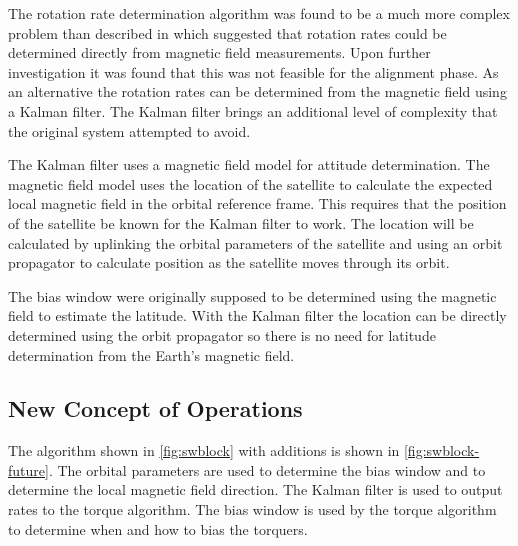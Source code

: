 The rotation rate determination algorithm was found to be a much more complex problem than described in \cite{Mentch11} which suggested that rotation rates could be determined directly from magnetic field measurements. Upon further investigation it was found that this was not feasible for the alignment phase. As an alternative the rotation rates can be determined from the magnetic field using a Kalman filter. The Kalman filter brings an additional level of complexity that the original system attempted to avoid. 

The Kalman filter uses a magnetic field model for attitude determination. The magnetic field model uses the location of the satellite to calculate the expected local magnetic field in the orbital reference frame. This requires that the position of the satellite be known for the Kalman filter to work. The location will be calculated by uplinking the orbital parameters of the satellite and using an orbit propagator to calculate position as the satellite moves through its orbit.

The bias window were originally supposed to be determined using the magnetic field to estimate the latitude. With the Kalman filter the location can be directly determined using the orbit propagator so there is no need for latitude determination from the Earth's magnetic field.

\subsection{New Concept of Operations}

The algorithm shown in \cref{fig:swblock} with additions is shown in \cref{fig:swblock-future}. The orbital parameters are used to determine the bias window and to determine the local magnetic field direction. The Kalman filter is used to output rates to the torque algorithm. The bias window is used by the torque algorithm to determine when and how to bias the torquers.

